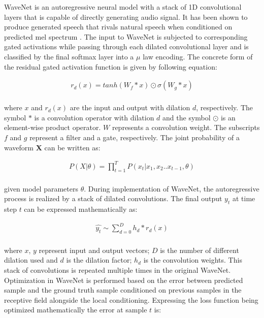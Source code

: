 WaveNet \citep{van2016WaveNet} is an autoregressive neural model with a stack of 1D convolutional layers that is capable of directly generating audio signal. It has been shown to produce generated speech that rivals natural speech when conditioned on predicted mel spectrum \citep{shen2017natural}. The input to WaveNet is subjected to corresponding gated activations while passing through each dilated convolutional layer and is classified by the final softmax layer into a $\mu$ law encoding.  The concrete form of the residual gated activation function is given by following equation:


\begin{equation} \label{WaveNet_Eqn}
\begin{split}
  r_d(x) = tanh(W_{f} * x) \odot \sigma (W_{g} * x)  \\ 
\end{split}
\end{equation}

\noindent where $x$ and $r_d(x)$ are the input and output with dilation $d$, respectively. The symbol $*$ is a convolution operator with dilation $d$ and the symbol $\odot$ is an element-wise product operator. $W$ represents a convolution weight. The subscripts $f$ and $g$ represent a filter and a gate, respectively. The joint probability of a waveform \textbf{X} can be written as:


\begin{equation} \label{WaveNet_gen_Eqn}
\begin{split}
  P(X | \theta)  = \prod_{t=1}^{T} P(x_t | x_1, x_2 .. x_{t-1}, \theta)  \\
\end{split}
\end{equation} 

\noindent given model parameters $\theta$. During implementation of WaveNet, the autoregressive process is realized by a stack of dilated convolutions. The final output $y_t$ at time step $t$ can be expressed mathematically as:

\begin{equation} 
\begin{split}
  \hat{y_t} \sim \sum_{d=0}^{D} h_d * r_d(x) \\
\end{split}
\label{WaveNet_Eqn}
\end{equation} 

\noindent where $x$, $y$ represent input and output vectors; $D$ is the number of different dilation used and $d$ is the dilation factor; $h_d$ is the convolution weights. This stack of convolutions is repeated multiple times in the original WaveNet. Optimization in WaveNet is performed based on the error between predicted sample and the ground truth sample conditioned on previous samples in the receptive field alongside the local conditioning. Expressing the loss function being optimized mathematically the error at sample $t$ is:


